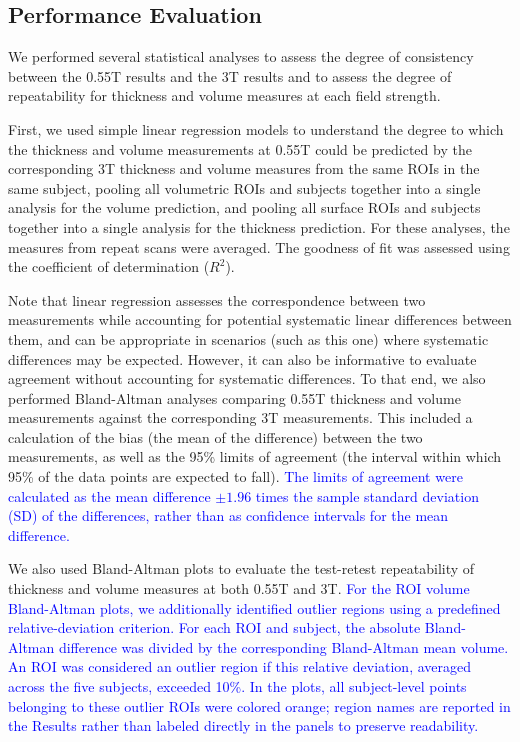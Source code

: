 \documentclass[12pt,letterpaper,onecolumn]{article}
\newcommand{\mycomment}[1]
{\todo[caption={#1},color=red!100!green!33,noline]{\color{black} \begin{spacing}{0.5}#1\vspace{-0.5em}\end{spacing}}}
\begin{document}
\subsection{Performance Evaluation}
We performed several statistical analyses to assess the degree of consistency between the 0.55T results and the 3T results and to assess the degree of repeatability for thickness and volume measures at each field strength.

First, we used simple linear regression models to understand the degree to which the thickness and volume measurements at 0.55T could be predicted by the corresponding 3T thickness and volume measures from the same ROIs in the same subject, pooling all volumetric ROIs and subjects together into a single analysis for the volume prediction, and pooling all surface ROIs and subjects together into a single analysis for the thickness prediction. For these analyses, the measures from repeat scans were averaged. The goodness of fit was assessed using the coefficient of determination ($R^2$).  

{Note that linear regression assesses the correspondence between two measurements while accounting for potential systematic linear differences between them, and can be  appropriate in scenarios (such as this one) where systematic differences may be expected.  However, it can also be informative to evaluate agreement without accounting for systematic differences.  To that end, we also performed Bland-Altman analyses\cite{altman1983measurement} comparing 0.55T thickness and volume measurements against the corresponding 3T measurements.} This included a calculation of the bias (the mean of the difference) between the two measurements, as well as the 95\% limits of agreement (the interval within which 95\% of the data points are expected to fall). \textcolor{blue}{The limits of agreement were calculated as the mean difference $\pm 1.96$ times the sample standard deviation (SD) of the differences, rather than as confidence intervals for the mean difference.\mycomment{R1.3}} 

We also used Bland-Altman plots  to evaluate the test-retest repeatability of thickness and volume measures at both 0.55T and 3T. \textcolor{blue}{For the ROI volume Bland-Altman plots, we additionally identified outlier regions using a predefined relative-deviation criterion. For each ROI and subject, the absolute Bland-Altman difference was divided by the corresponding Bland-Altman mean volume. An ROI was considered an outlier region if this relative deviation, averaged across the five subjects, exceeded 10\%. In the plots, all subject-level points belonging to these outlier ROIs were colored orange; region names are reported in the Results rather than labeled directly in the panels to preserve readability.\mycomment{R1.3}}
\end{document}
